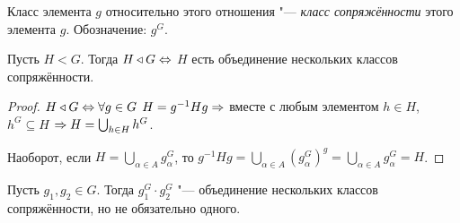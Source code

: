 \documentclass[main]{subfiles}
\begin{document}
\begin{definition}
  Класс элемента \( g \)
  относительно этого отношения "---
  \emph{класс сопряжённости} этого
  элемента $g$. Обозначение: $g^G$.
\end{definition}

\begin{proposition}
  Пусть $H < G$.
  Тогда $H \triangleleft G \Leftrightarrow$ $H$ есть объединение
  нескольких классов сопряжённости.
\end{proposition}
\begin{proof}
  $H \triangleleft G \Leftrightarrow \forall {g \in G} \; \, H = g^{-1} H g \Rightarrow$ вместе с любым элементом
  $h \in H$, $h^G \subseteq H$ $\Rightarrow H = \bigcup_{h \in H} h^G$.

  Наоборот, если $H = \bigcup_{\alpha \in A} g_\alpha^G$,
  то $g^{-1} Hg =
  \bigcup_{\alpha \in A} (g_\alpha^G)^g =
  \bigcup_{\alpha \in A} g_\alpha^G = H$.
\end{proof}

\begin{exercise}
  Пусть $g_1, g_2 \in G$. Тогда $g_1^G \cdot g_2^G$ "--- объединение нескольких
  классов сопряжённости, но не обязательно одного.
\end{exercise}
\end{document}
